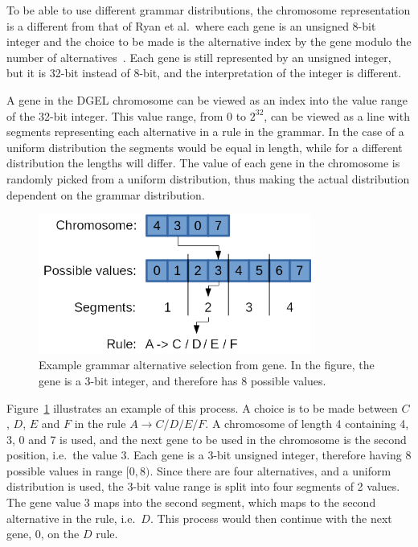 To be able to use different grammar distributions, the chromosome representation is a different from that of Ryan et al.\ where each gene is an unsigned 8-bit integer and the choice to be made is the alternative index by the gene modulo the number of alternatives~\cite{1998Ryan}.
Each gene is still represented by an unsigned integer, but it is 32-bit instead of 8-bit, and the interpretation of the integer is different.

A gene in the \gls{DGEL} chromosome can be viewed as an index into the value range of the 32-bit integer.
This value range, from $0$ to $2^{32}$, can be viewed as a line with segments representing each alternative in a rule in the grammar.
In the case of a uniform distribution the segments would be equal in length, while for a different distribution the lengths will differ.
The value of each gene in the chromosome is randomly picked from a uniform distribution, thus making the actual distribution dependent on the grammar distribution.

\begin{figure}
    \centering
    \includegraphics[width=0.8\textwidth]{figures/gene}
    \caption[Example grammar alternative selection from gene]{Example grammar alternative selection from gene. In the figure, the gene is a 3-bit integer, and therefore has 8 possible values.}
    \label{fig:gene}
\end{figure}

Figure~\ref{fig:gene} illustrates an example of this process.
A choice is to be made between $C$, $D$, $E$ and $F$ in the rule $A \rightarrow C / D / E / F$.
A chromosome of length 4 containing 4, 3, 0 and 7 is used, and the next gene to be used in the chromosome is the second position, i.e.\ the value 3.
Each gene is a 3-bit unsigned integer, therefore having 8 possible values in range $[0, 8)$.
Since there are four alternatives, and a uniform distribution is used, the 3-bit value range is split into four segments of 2 values.
The gene value 3 maps into the second segment, which maps to the second alternative in the rule, i.e.\ $D$.
This process would then continue with the next gene, 0, on the $D$ rule.


